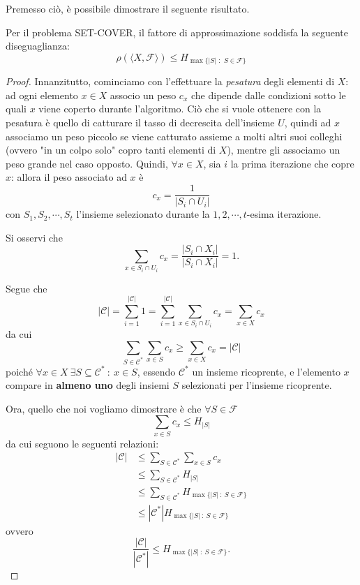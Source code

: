 Premesso ciò, è possibile dimostrare il seguente risultato.
\begin{proposizione}
Per il problema SET-COVER, il fattore di approssimazione soddisfa la seguente diseguaglianza:
\[
\rho (\langle X, \mathcal{F} \rangle) \leq H_{\max\{|S|\,\,:\,\,S\in\mathcal{F}\}}
\]
\end{proposizione}
\begin{proof}
Innanzitutto, cominciamo con l'effettuare la \textit{pesatura} degli elementi di $X$: ad ogni elemento $x\in X$ associo un peso $c_x$ che dipende dalle condizioni sotto le quali $x$ viene coperto durante l'algoritmo. Ciò che si vuole ottenere con la pesatura è quello di catturare il tasso di decrescita dell'insieme $U$, quindi ad $x$ associamo un peso piccolo se viene catturato assieme a molti altri suoi colleghi (ovvero "in un colpo solo" copro tanti elementi di $X$), mentre gli associamo un peso grande nel caso opposto. Quindi, $\forall x \in X$, sia $i$ la prima iterazione che copre $x$: allora il peso associato ad $x$ è
\[
c_x = \frac{1}{|S_i \cap U_i|}
\]
con $S_1, S_2, \cdots, S_t$ l'insieme selezionato durante la $1, 2, \cdots, t$-esima iterazione.

Si osservi che
\[
\sum_{x\in S_i\cap U_i} c_x = \frac{|S_i \cap X_i|}{|S_i \cap X_i|} = 1.
\]

Segue che
\[
|\mathcal{C}| = \sum_{i=1}^{|\mathcal{C}|} 1 = \sum_{i=1}^{|\mathcal{C}|} \sum_{x\in S_i\cap U_i} c_x = \sum_{x\in X} c_x
\]
da cui
\[
\sum_{S\in \mathcal{C^*}} \sum_{x\in S} c_x \geq \sum_{x\in X} c_x = |\mathcal{C}|
\]
poiché $\forall x \in X\ \exists S \subseteq \mathcal{C^*}\ :\ x \in S$, essendo $\mathcal{C^*}$ un insieme ricoprente, e l'elemento $x$ compare in \textbf{almeno uno} degli insiemi $S$ selezionati per l'insieme ricoprente.

Ora, quello che noi vogliamo dimostrare è che $\forall S\in\mathcal{F}$
\[
\sum_{x\in S} c_x \leq H_{|S|}
\]
da cui seguono le seguenti relazioni:
\[
\begin{split}
|\mathcal{C}| &\leq \sum_{S\in\mathcal{C^*}} \sum_{x\in S} c_x \\
&\leq \sum_{S\in\mathcal{C^*}} H_{|S|} \\
&\leq \sum_{S\in\mathcal{C^*}} H_{\max \{|S|\ :\ S\in\mathcal{F}\}} \\
&\leq |\mathcal{C^*}| H_{\max \{|S|\ :\ S\in\mathcal{F}\}}
\end{split}
\]
ovvero
\[
\frac{|\mathcal{C}|}{|\mathcal{C^*}|} \leq H_{\max\{|S|\ :\ S\in\mathcal{F}\}}.
\]


\end{proof}
